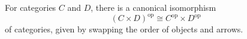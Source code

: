 For categories $C$ and $D$, there is a canonical isomorphism
$$(C \times D)^{\mathrm{op}} \cong C^{\mathrm{op}} \times D^{\mathrm{op}}$$
of categories, given by swapping the order of objects and arrows.
